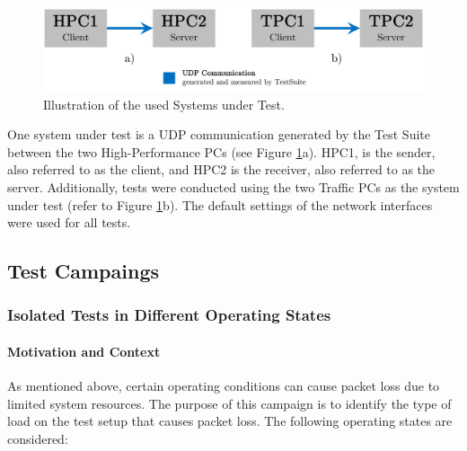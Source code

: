 \begin{figure}[h!]
    \centering
    \includegraphics[width=1\linewidth]{figures/reliability/star/rel_g_1.pdf}
    \caption{Illustration of the used Systems under Test.}
    \label{fig:sutreliability}
\end{figure}

One system under test is a UDP communication generated by the Test Suite between the two High-Performance PCs (see Figure \ref{fig:sutreliability}a). HPC1, is the sender, also referred to as the client, and HPC2 is the receiver, also referred to as the server. Additionally, tests were conducted using the two Traffic PCs as the system under test (refer to Figure \ref{fig:sutreliability}b). The default settings of the network interfaces were used for all tests.

\subsection{Test Campaings}

\subsubsection{Isolated Tests in Different Operating States} \label{chap:relcamp1}
\paragraph{Motivation and Context}

As mentioned above, certain operating conditions can cause packet loss due to limited system resources. The purpose of this campaign is to identify the type of load on the test setup that causes packet loss. The following operating states are considered:

